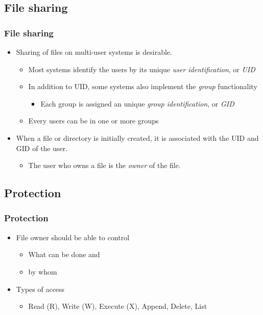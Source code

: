 \documentclass[CJKutf8,dvipsnames,table]{beamer}
\begin{document}
\begin{CJK*}{UTF8}{song}
  \subsection{File sharing}

  \begin{frame}
    \frametitle{File sharing} \pause
    \begin{itemize}
    \item Sharing of files on multi-user systems is desirable. \pause
      \begin{itemize}
      \item Most systems identify the users by its unique \emph{user identification}, or \emph{UID} \pause
      \item In addition to UID, some systems also implement the \emph{group} functionality \pause
        \begin{itemize}
        \item Each group is assigned an unique \emph{group identification}, or \emph{GID} \pause
        \end{itemize}
      \item Every users can be in one or more groups \pause
      \end{itemize}
    \item When a file or directory is initially created, it is associated with the UID and GID of the user. \pause
      \begin{itemize}
      \item The user who owns a file is the \emph{owner} of the file.
      \end{itemize}
    \end{itemize}
  \end{frame}

  \subsection{Protection}

  \begin{frame}
    \frametitle{Protection} \pause
    \begin{itemize}\parskip=0pt
    \item File owner should be able to control \pause
      \begin{itemize}\parskip=0pt
      \item What can be done and \pause
      \item by whom \pause
      \end{itemize}
    \item Types of access \pause
      \begin{itemize}\parskip=0pt
      \item Read (R), Write (W), Execute (X), Append, Delete, List
      \end{itemize}
    \end{itemize}
  \end{frame}


\end{CJK*}
\end{document}
